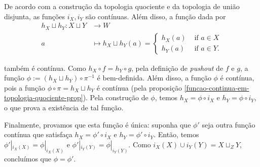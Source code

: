 \begin{dem}
    De acordo com a construção da topologia quociente e da topologia de união disjunta, as funções $i_X,i_Y$ são contínuas. Além disso, a função dada por 
    \begin{align*}
        h_X\sqcup h_Y:X\sqcup Y&\longrightarrow W\\
        a&\longmapsto h_X\sqcup h_Y(a)=\begin{cases}
         h_X(a) & \text{ if }a\in X\\
         h_Y(a) & \text{ if }a\in Y.
        \end{cases}
    \end{align*}

    também é contínua. Como $h_X\circ f=h_Y\circ g$, pela definição de \emph{pushout} de $f$ e $g$, a função $\phi:=(h_X\sqcup h_Y)\circ \pi^{-1}$ é bem-definida. Além disso, a função $\phi$ é contínua, pois a função $\phi\circ\pi=h_X\sqcup h_Y$ é contínua (pela proposição \ref{funcao-continua-em-topologia-quociente-prop}). Pela construção de $\phi$, temos $h_X=\phi\circ i_X$ e $h_Y=\phi\circ i_Y$, o que prova a existência de tal função.


    Finalmente, provamos que esta função é única: suponha que $\phi'$ seja outra função contínua que satisfaça $h_X=\phi'\circ i_X$ e $h_Y=\phi'\circ i_Y$. Então, temos $\phi'|_{i_X(X)}=\phi|_{i_X(X)}$ e $\phi'|_{i_Y(Y)}=\phi|_{i_Y(Y)}$. Como $i_X(X)\cup i_Y(Y)=X\sqcup_ZY$, concluímos que $\phi=\phi'$.
\end{dem}


